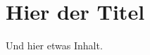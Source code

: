 \documentclass[a4paper,12pt]{scrartcl}
\begin{document}
    \raggedbottom


    \section*{Hier der Titel}

    Und hier etwas Inhalt.
\end{document}
